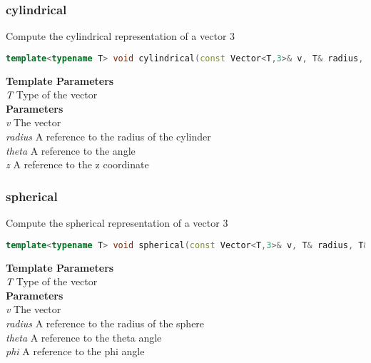 \subsubsection{cylindrical}
\begin{mdframed}
Compute the cylindrical representation of a vector 3
\begin{lstlisting}[language=C++]
template<typename T> void cylindrical(const Vector<T,3>& v, T& radius, T& theta, T& z) 
\end{lstlisting}
\textbf{Template Parameters} \\ 
\textit{T} Type of the vector \\ 
\textbf{Parameters} \\ 
\textit{v} The vector \\ 
\textit{radius} A reference to the radius of the cylinder \\ 
\textit{theta} A reference to the angle \\ 
\textit{z} A reference to the z coordinate \\ 
\end{mdframed}

\subsubsection{spherical}
\begin{mdframed}
Compute the spherical representation of a vector 3
\begin{lstlisting}[language=C++]
template<typename T> void spherical(const Vector<T,3>& v, T& radius, T& theta, T& phi) 
\end{lstlisting}
\textbf{Template Parameters} \\ 
\textit{T} Type of the vector \\ 
\textbf{Parameters} \\ 
\textit{v} The vector \\ 
\textit{radius} A reference to the radius of the sphere \\ 
\textit{theta} A reference to the theta angle \\ 
\textit{phi} A reference to the phi angle \\ 
\end{mdframed}

